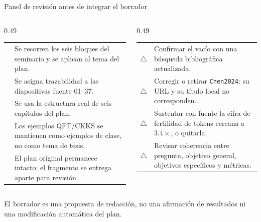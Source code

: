 \documentclass[aspectratio=169,10pt,spanish]{beamer}
\newcommand{\ok}{\textcolor{bpGreen}{\bfseries\checkmark}}
\newcommand{\pendiente}{\textcolor{bpRust}{\bfseries\(\triangle\)}}
\begin{document}
\begin{frame}{Panel de revisión antes de integrar el borrador}
    \begin{columns}[T,onlytextwidth]
        \begin{column}{0.49\textwidth}
            \begin{tcolorbox}[enhanced,colback=bpGreen!5,colframe=bpGreen,
                title=\textbf{Aplicación realizada},arc=1.5mm]
                \scriptsize
                \begin{tabular}{@{}p{0.35cm}p{5.55cm}@{}}
                    \ok & Se recorren los seis bloques del seminario y se aplican al tema del plan.\\[1mm]
                    \ok & Se asigna trazabilidad a las diapositivas fuente 01--37.\\[1mm]
                    \ok & Se usa la estructura real de seis capítulos del plan.\\[1mm]
                    \ok & Los ejemplos QFT/CKKS se mantienen como ejemplos de clase, no como tema de tesis.\\[1mm]
                    \ok & El plan original permanece intacto; el fragmento se entrega aparte para revisión.
                \end{tabular}
            \end{tcolorbox}
        \end{column}
        \begin{column}{0.49\textwidth}
            \begin{tcolorbox}[enhanced,colback=bpGold!8,colframe=bpRust,
                title=\textbf{Pendiente de validar en el plan},arc=1.5mm]
                \scriptsize
                \begin{tabular}{@{}p{0.35cm}p{5.55cm}@{}}
                    \pendiente & Confirmar el vacío con una búsqueda bibliográfica actualizada.\\[1mm]
                    \pendiente & Corregir o retirar \texttt{Chen2024}: su URL y su título local no corresponden.\\[1mm]
                    \pendiente & Sustentar con fuente la cifra de fertilidad de tokens cercana a \(3.4\times\), o quitarla.\\[1mm]
                    \pendiente & Revisar coherencia entre pregunta, objetivo general, objetivos específicos y métricas.
                \end{tabular}
            \end{tcolorbox}
        \end{column}
    \end{columns}
    \vspace{0.12cm}
    \begin{tcolorbox}[colback=bpNavy,colframe=bpNavy,arc=1mm,top=1mm,bottom=1mm]
        \centering\tiny\color{white}
        El borrador es una propuesta de redacción, no una afirmación de resultados ni una modificación automática del plan.
    \end{tcolorbox}
\end{frame}
\end{document}
